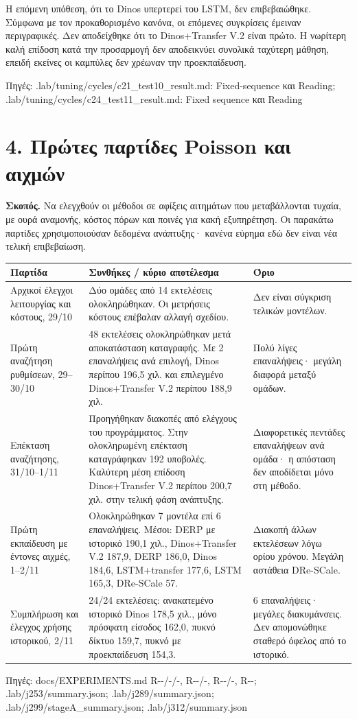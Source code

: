 \documentclass[10pt,a4paper]{article}
\newcommand{\src}[1]{\par{\scriptsize\color{gray}Πηγές: {\ttfamily #1}}\par}
\newcommand{\page}[1]{\clearpage\section*{#1}}
\begin{document}
Η επόμενη υπόθεση, ότι το Dinos υπερτερεί του LSTM, δεν επιβεβαιώθηκε. Σύμφωνα με τον προκαθορισμένο κανόνα, οι επόμενες συγκρίσεις έμειναν περιγραφικές. Δεν αποδείχθηκε ότι το Dinos+Transfer V.2 είναι πρώτο. Η νωρίτερη καλή επίδοση κατά την προσαρμογή δεν αποδεικνύει συνολικά ταχύτερη μάθηση, επειδή εκείνες οι καμπύλες δεν χρέωναν την προεκπαίδευση.
\src{.lab/\allowbreak tuning/\allowbreak cycles/\allowbreak c21\_test10\_result.md: Fixed-\allowbreak sequence και Reading; .lab/\allowbreak tuning/\allowbreak cycles/\allowbreak c24\_test11\_result.md: Fixed sequence και Reading}
\page{4. Πρώτες παρτίδες Poisson και αιχμών}
\textbf{Σκοπός.} Να ελεγχθούν οι μέθοδοι σε αφίξεις αιτημάτων που μεταβάλλονται τυχαία, με ουρά αναμονής, κόστος πόρων και ποινές για κακή εξυπηρέτηση. Οι παρακάτω παρτίδες χρησιμοποιούσαν δεδομένα ανάπτυξης· κανένα εύρημα εδώ δεν είναι νέα τελική επιβεβαίωση.
\begin{tabular}{p{3.5cm}p{7.4cm}p{4.1cm}}\toprule
Παρτίδα & Συνθήκες / κύριο αποτέλεσμα & Όριο\\\midrule
Αρχικοί έλεγχοι λειτουργίας και κόστους, 29/10 & Δύο ομάδες από 14 εκτελέσεις ολοκληρώθηκαν. Οι μετρήσεις κόστους επέβαλαν αλλαγή σχεδίου. & Δεν είναι σύγκριση τελικών μοντέλων.\\
Πρώτη αναζήτηση ρυθμίσεων, 29--30/10 & 48 εκτελέσεις ολοκληρώθηκαν μετά αποκατάσταση καταγραφής. Με 2 επαναλήψεις ανά επιλογή, Dinos περίπου 196,5 χιλ. και επιλεγμένο Dinos+Transfer V.2 περίπου 188,9 χιλ. & Πολύ λίγες επαναλήψεις· μεγάλη διαφορά μεταξύ ομάδων.\\
Επέκταση αναζήτησης, 31/10--1/11 & Προηγήθηκαν διακοπές από ελέγχους του προγράμματος. Στην ολοκληρωμένη επέκταση καταγράφηκαν 192 υποβολές. Καλύτερη μέση επίδοση Dinos+Transfer V.2 περίπου 200,7 χιλ. στην τελική φάση ανάπτυξης. & Διαφορετικές πεντάδες επαναλήψεων ανά ομάδα· η απόσταση δεν αποδίδεται μόνο στη μέθοδο.\\
Πρώτη εκπαίδευση με έντονες αιχμές, 1--2/11 & Ολοκληρώθηκαν 7 μοντέλα επί 6 επαναλήψεις. Μέσοι: DERP με ιστορικό 190,1 χιλ., Dinos+Transfer V.2 187,9, DERP 186,0, Dinos 184,6, LSTM+transfer 177,6, LSTM 165,3, DRe-SCale 57. & Διακοπή άλλων εκτελέσεων λόγω ορίου χρόνου. Μεγάλη αστάθεια DRe-SCale.\\
Συμπλήρωση και έλεγχος χρήσης ιστορικού, 2/11 & 24/24 εκτελέσεις: ανακατεμένο ιστορικό Dinos 178,5 χιλ., μόνο πρόσφατη είσοδος 162,0, πυκνό δίκτυο 159,7, πυκνό με προεκπαίδευση 154,3. & 6 επαναλήψεις· μεγάλες διακυμάνσεις. Δεν απομονώθηκε σταθερό όφελος από το ιστορικό.\\\bottomrule
\end{tabular}
\src{docs/\allowbreak EXPERIMENTS.md R--\allowbreak 006/\allowbreak -\allowbreak 007/\allowbreak -\allowbreak 010, R-\allowbreak 20261031-\allowbreak 001/\allowbreak -\allowbreak 002, R-\allowbreak 20261101-\allowbreak 002/\allowbreak -\allowbreak 005, R-\allowbreak 20261102-\allowbreak 001; .lab/\allowbreak j253/\allowbreak summary.json; .lab/\allowbreak j289/\allowbreak summary.json; .lab/\allowbreak j299/\allowbreak stageA\_summary.json; .lab/\allowbreak j312/\allowbreak summary.json}
\end{document}
